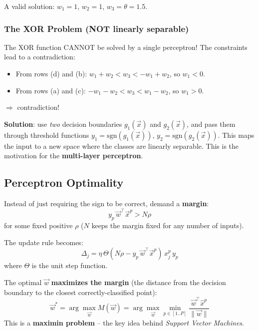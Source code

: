 \documentclass[11pt,a4paper]{article}
\newcommand{\vx}{\vec{x}}
\newcommand{\sgn}{\text{sgn}}
\begin{document}
A valid solution: $w_1 = 1$, $w_2 = 1$, $w_3 = \theta = 1.5$.

\subsubsection{The XOR Problem (NOT linearly separable)}

\begin{warningbox}
The XOR function CANNOT be solved by a single perceptron! The constraints lead to a contradiction:
\begin{itemize}[leftmargin=*]
    \item From rows (d) and (b): $w_1 + w_2 < w_3 < -w_1 + w_2$, so $w_1 < 0$.
    \item From rows (a) and (c): $-w_1 - w_2 < w_3 < w_1 - w_2$, so $w_1 > 0$.
\end{itemize}
$\Rightarrow$ contradiction!
\end{warningbox}

\textbf{Solution}: use \emph{two} decision boundaries $g_1(\vx)$ and $g_2(\vx)$, and pass them through threshold functions $y_1 = \sgn(g_1(\vx))$, $y_2 = \sgn(g_2(\vx))$. This maps the input to a new space where the classes are linearly separable. This is the motivation for the \textbf{multi-layer perceptron}.

\subsection{Perceptron Optimality}

Instead of just requiring the sign to be correct, demand a \textbf{margin}:
\[
y_p\, \vec{w}^\top \vx^p > N\rho
\]
for some fixed positive $\rho$ ($N$ keeps the margin fixed for any number of inputs).

The update rule becomes:
\[
\Delta_j = \eta\, \Theta(N\rho - y_p\, \vec{w}^\top \vx^p)\, x_j^p\, y_p
\]
where $\Theta$ is the unit step function.

\begin{keybox}[title=Optimal Weight Vector (Support Vector Machine Idea)]
The optimal $\vec{w}$ \textbf{maximizes the margin} (the distance from the decision boundary to the closest correctly-classified point):
\[
\vec{w}^* = \arg\max_{\vec{w}} M(\vec{w}) = \arg\max_{\vec{w}} \min_{p\in[1..P]} \frac{\vec{w}^\top \hat{x}^p}{\|\vec{w}\|}
\]
This is a \textbf{maximin problem} -- the key idea behind \emph{Support Vector Machines}.
\end{keybox}

\newpage
\end{document}
